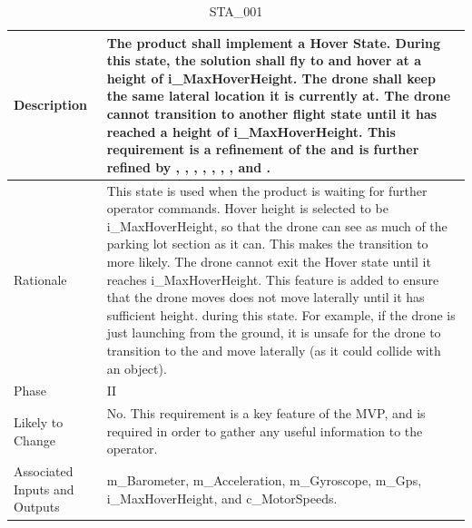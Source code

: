 \documentclass{article}
\begin{document}
\begin{table}[!h]
\begin{center}
\caption {STA\_001} 
\label{STA_001}
\begin{tabular}{ | m{3cm} | m{11cm} | }
\hline
Description & The product shall implement a Hover State. During this state, the solution shall fly to and hover at a height of i\_MaxHoverHeight. The drone shall keep the same lateral location it is currently at. The drone cannot transition to another flight state until it has reached a height of i\_MaxHoverHeight. This requirement is a refinement of the \nameref{Hover State} and is further refined by \nameref{PERF_002}, \nameref{PERF_004}, \nameref{PERF_005}, \nameref{PERF_006}, \nameref{PERF_007}, \nameref{SAFE_001}, \nameref{SAFE_003}, and \nameref{USE_003}. \\
\hline
Rationale & This state is used when the product is waiting for further operator commands. Hover height is selected to be i\_MaxHoverHeight, so that the drone can see as much of the parking lot section as it can. This makes the transition to \nameref{Autonomous Explore State} more likely.
The drone cannot exit the Hover state until it reaches i\_MaxHoverHeight. This feature is added to ensure that the drone moves does not move laterally until it has sufficient height. during this state. For example, if the drone is just launching from the ground, it is unsafe for the drone to transition to the \nameref{Autonomous Explore State} and move laterally (as it could collide with an object).    \\
\hline
Phase & II \\
\hline
Likely to Change & No. This requirement is a key feature of the MVP, and is required in order to gather any useful information to the operator. \\
\hline
Associated Inputs and Outputs & m\_Barometer, m\_Acceleration, m\_Gyroscope, m\_Gps, i\_MaxHoverHeight, and c\_MotorSpeeds. \\
\hline
\end{tabular}
\end{center}
\end{table}
\end{document}
